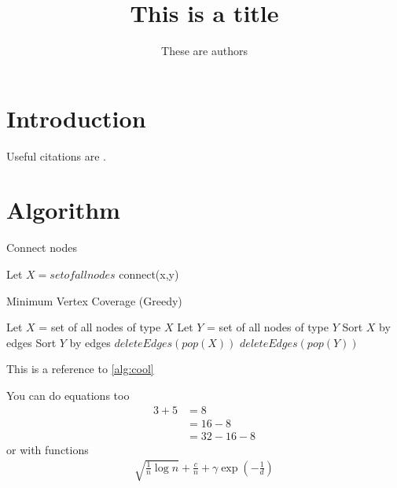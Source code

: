 \documentclass{article}
\title{This is a title}
\author{These are authors}
\begin{document}
\maketitle

\section{Introduction}

Useful citations are \cite{KW14,GKK13}.

\section{Algorithm}

\begin{algorithm}[H]
\caption{Connect nodes}\label{alg:cool}
\begin{algorithmic}
\State Let $X = set of all nodes$
\State connect(x,y)
\EndIf
\EndFor
\EndFor
\end{algorithmic}
\end{algorithm}

\begin{algorithm}[H]
\caption{Minimum Vertex Coverage (Greedy)}
\begin{algorithmic}
\State Let $X$ = set of all nodes of type $X$
\State Let $Y$ = set of all nodes of type $Y$
\State Sort $X$ by edges
\State Sort $Y$ by edges
\State $deleteEdges(pop(X))$
\Else
\State $deleteEdges(pop(Y))$
\EndIf
\EndWhile
\end{algorithmic}
\end{algorithm}

This is a reference to \cref{alg:cool}

You can do equations too
\begin{align}
3 + 5 
&= 8 \\
&= 16 - 8 \\
&= 32 - 16 - 8
\end{align}
or with functions
\begin{align}
\sqrt{\frac{1}{n} \log n} + \frac{c}{n} + \gamma \exp\left(-\frac{1}{d}\right)
\end{align}
\end{document}
